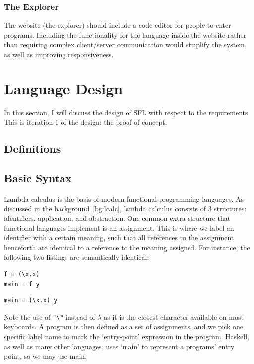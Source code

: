\subsubsection{The Explorer}
The website (the explorer) should include a code editor for people to enter programs. Including the functionality for the language inside the website rather than requiring complex client/server communication would simplify the system, as well as improving responsiveness. 

\section{Language Design}
In this section, I will discuss the design of \ac{SFL} with respect to the requirements. This is iteration 1 of the design: the proof of concept.  

\subsection{Definitions}


\subsection{Basic Syntax}
Lambda calculus is the basis of modern functional programming languages. As discussed in the background~\ref{bg:lcalc}, lambda calculus consists of 3 structures: identifiers, application, and abstraction. One common extra structure that functional languages implement is an assignment. This is where we label an identifier with a certain meaning, such that all references to the assignment henceforth are identical to a reference to the meaning assigned. For instance, the following two listings are semantically identical:
\begin{lstlisting}[language=SFL]
f = (\x.x)
main = f y
\end{lstlisting}
\begin{lstlisting}[language=SFL]
main = (\x.x) y
\end{lstlisting}
Note the use of \verb|"\"| instead of \(\lambda\) as it is the closest character available on most keyboards. A program is then defined as a set of assignments, and we pick one specific label name to mark the `entry-point' expression in the program. Haskell, as well as many other languages, uses `main' to represent a programs' entry point, so we may use main. 

